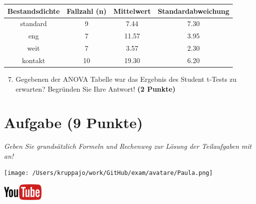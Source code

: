 \documentclass[a4paper, 9pt]{scrartcl}\usepackage[]{graphicx}\usepackage[]{xcolor}
\newenvironment{knitrout}{}{} %
\begin{document}
\begin{knitrout}
\color{fgcolor}\begin{table}[!h]
\centering\begingroup\fontsize{11}{13}\selectfont

\begin{tabular}{cccc}
\toprule
\textbf{Bestandsdichte} & \textbf{Fallzahl (n)} & \textbf{Mittelwert} & \textbf{Standardabweichung}\\
\midrule
standard & 9 & 7.44 & 7.30\\
eng & 7 & 11.57 & 3.95\\
weit & 7 & 3.57 & 2.30\\
kontakt & 10 & 19.30 & 6.20\\
\bottomrule
\end{tabular}
\endgroup{}
\end{table}

\end{knitrout}


\begin{enumerate}
  \setcounter{enumi}{6}
\item Gegebenen der ANOVA Tabelle war das Ergebnis des Student t-Tests zu erwarten? Begründen Sie Ihre Antwort! \textbf{(2 Punkte)}
\end{enumerate}

 
\clearpage

\section{Aufgabe \hfill (9 Punkte)}

\textit{Geben Sie grundsätzlich Formeln und Rechenweg zur Lösung der Teilaufgaben mit an!} \\[1Ex]
 

 
\begin{minipage}[t]{0.5\textwidth}
\texttt{[image: /Users/kruppajo/work/GitHub/exam/avatare/Paula.png]}
\end{minipage}
\begin{minipage}[t]{0.5\textwidth}
\hfill
\href{https://youtu.be/aXvxGC4YLqk}{\includegraphics[width = 2cm]{img/youtube}}\\[1Ex]
\end{minipage}
\vspace{1ex}
\end{document}
